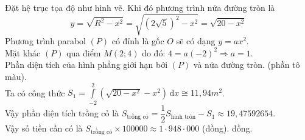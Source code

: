 \begin{vd}
{\begin{center}
\begin{tikzpicture}[samples=200]
			\end{tikzpicture}
		\end{center}
		Đặt hệ trục tọa độ như hình vẽ. Khi đó phương trình nửa đường tròn là \[y=\sqrt{R^2-x^2}=\sqrt{(2\sqrt{5})^2-x^2}=\sqrt{20-x^2}\] 
		Phương trình parabol $(P)$ có đỉnh là gốc $O$ sẽ có dạng $y=ax^2$.\\
		Mặt khác $(P)$ qua điểm $M(2;4)$ do đó: $4=a(-2)^2\Rightarrow a=1$.\\
		Phần diện tích của hình phẳng giới hạn bởi $(P)$ và nửa đường tròn. (phần tô màu).\\
		Ta có công thức $S_1=\displaystyle\int\limits_{-2}^2\left(\sqrt{20-x^2}-x^2\right)\mathrm{\,d}x\cong 11,94m^2$.\\
		Vậy phần diện tích trồng cỏ là $S_{\text{trồng cỏ}}=\dfrac{1}{2}S_{\text{hình tròn}}-S_1\approx 19,47592654$.\\
		Vậy số tiền cần có là $S_{\text{trồng cỏ}}\times 100000\approx 1\cdot 948\cdot 000$ (đồng). đồng.}
\end{vd}
